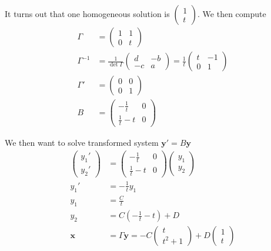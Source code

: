 \documentclass[10pt]{report}
\begin{document}
It turns out that one homogeneous solution is $\begin{pmatrix} 1\\t \end{pmatrix}$. We then compute
\begin{align}
    \Gamma &= \begin{pmatrix} 1 & 1 \\ 0 & t \end{pmatrix} \\
    \Gamma^{-1} &= \frac{1}{\det \Gamma} \begin{pmatrix} d & -b \\ -c & a \end{pmatrix} = \frac{1}{t}\begin{pmatrix} t & -1 \\ 0 & 1 \end{pmatrix}\\
    \Gamma' &= \begin{pmatrix} 0 & 0 \\ 0 & 1 \end{pmatrix} \\
    B &= \begin{pmatrix} -\frac{1}{t} & 0\\ \frac{1}{t} - t  & 0\end{pmatrix} 
\end{align}

We then want to solve transformed system $\mathbf{y}' = B\mathbf{y}$
\begin{align}
    \begin{pmatrix} y_1' \\ y_2' \end{pmatrix}  &= \begin{pmatrix} -\frac{1}{t} & 0 \\ \frac{1}{t} - t & 0 \end{pmatrix} \begin{pmatrix} y_1 \\ y_2 \end{pmatrix} \\
    y_1' &= -\frac{1}{t}y_1\\
    y_1 &= \frac{C}{t}\\
    y_2 &= C\left( -\frac{1}{t} - t \right) + D\\
    \mathbf{x} &= \Gamma \mathbf{y} = -C\begin{pmatrix} t\\t^2 + 1 \end{pmatrix} + D\begin{pmatrix} 1 \\t\end{pmatrix} 
\end{align}
\end{document}
